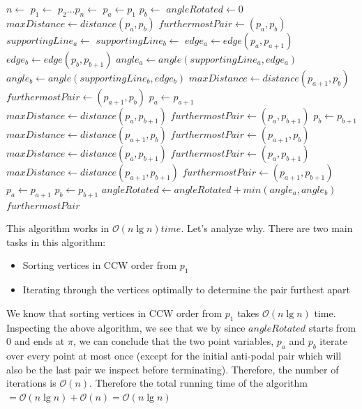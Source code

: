 \documentclass{article}
\begin{document}
\begin{algorithmic}
\State $n \gets $
\State $p_1 \gets $ 
\State $p_2 \dots p_n\gets $ 
\State $p_a \gets p_1 $
\State $p_b \gets $
\State $angleRotated \gets 0 $
\State $maxDistance \gets distance(p_a, p_b)$
\State $furthermostPair \gets (p_a, p_b) $
\State $supportingLine_a \gets $ 
\State $supportingLine_b \gets $ 
	\State $edge_a \gets edge(p_a, p_{a+1})$
	\State $edge_b \gets edge(p_b, p_{b+1})$
	\State $angle_a \gets angle(supportingLine_a, edge_a)$
	\State $angle_b \gets angle(supportingLine_b, edge_b)$
			\State $maxDistance \gets distance(p_{a+1}, p_b)$
			\State $furthermostPair \gets (p_{a+1}, p_b) $
		\EndIf
		\State $p_a \gets p_{a+1} $
			\State $maxDistance \gets distance(p_a, p_{b+1})$
			\State $furthermostPair \gets (p_a, p_{b+1}) $
		\EndIf
		\State $p_b \gets p_{b+1} $
	\Else {}
			\State $maxDistance \gets distance(p_{a+1}, p_b)$
			\State $furthermostPair \gets (p_{a+1}, p_b) $
			\State $maxDistance \gets distance(p_a, p_{b+1})$
			\State $furthermostPair \gets (p_a, p_{b+1}) $
			\State $maxDistance \gets distance(p_{a+1}, p_{b+1})$
			\State $furthermostPair \gets (p_{a+1}, p_{b+1}) $
		\EndIf
		\State $p_a \gets p_{a+1} $ 
		\State $p_b \gets p_{b+1} $ 	
	\EndIf
	\State $angleRotated \gets angleRotated + min(angle_a, angle_b)$
\EndWhile
\State \Return $furthermostPair$
\end{algorithmic}

This algorithm works in $\mathcal{O}(n \lg n) time$. Let's analyze why. There are two main tasks in this algorithm:
\begin{itemize}
  \item Sorting vertices in CCW order from $p_1$
  \item Iterating through the vertices optimally to determine the pair furthest apart
\end{itemize}
We know that sorting vertices in CCW order from $p_1$ takes $\mathcal{O}(n \lg n)$ time.
\newline 
Inspecting the above algorithm, we see that we by since $angleRotated$ starts from 0 and ends at $\pi$, we can conclude that the two point variables, $p_a$ and $p_b$ iterate over every point at most once (except for the initial anti-podal pair which will also be the last pair we inspect before terminating). Therefore, the number of iterations is $\mathcal{O}(n)$.
\newline
Therefore the total running time of the algorithm $= \mathcal{O}(n \lg n) + \mathcal{O}(n) = \mathcal{O}(n \lg n)$
\end{document}
